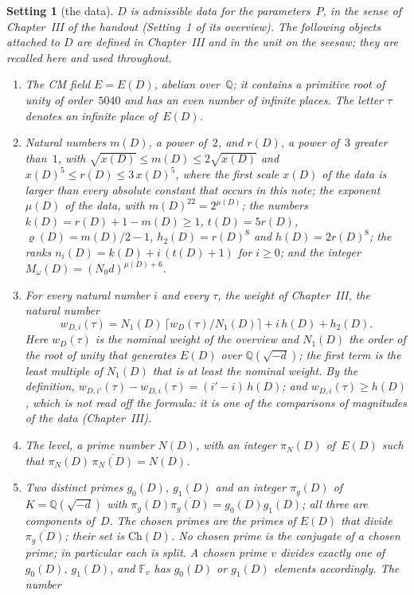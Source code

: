 \documentclass[11pt,a4paper]{article}
\newcommand{\F}{\mathbb{F}}
\newcommand{\m}[1]{\mbox{$#1$}}        %
\theoremstyle{plainx}
\theoremstyle{uprightx}
\newtheorem{setting}[theorem]{Setting}          %
\newcommand{\Ch}{\mathrm{Ch}}
\begin{document}
\begin{setting}[the data]\label{s:data}
$D$ is admissible data for the parameters~$P$, in the sense of Chapter~III of the handout (Setting~1 of its
overview). The following objects attached to $D$ are defined in Chapter~III and in the unit on the seesaw; they
are recalled here and used throughout.
\begin{enumerate}[label=\textup{(\roman*)},leftmargin=2.3em,itemsep=2pt]
\item The CM field \m{E=E(D)}, abelian over~$\mathbb Q$; it contains a primitive root of unity of order~$5040$ and
has an even number of infinite places. The letter $\tau$ denotes an infinite place of~$E(D)$.
\item Natural numbers $m(D)$, a power of~$2$, and $r(D)$, a power of~$3$ greater than~$1$, with
\m{\sqrt{x(D)}\le m(D)\le2\sqrt{x(D)}} and \m{x(D)^5\le r(D)\le3\,x(D)^5}, where the first scale $x(D)$ of the data is
larger than every absolute constant that occurs in this note; the exponent $\mu(D)$ of the data, with
\m{m(D)^{22}=2^{\mu(D)}}; the numbers
\m{k(D)=r(D)+1-m(D)\ge1}, \m{t(D)=5r(D)}, \m{\varrho(D)=m(D)/2-1}, \m{h_2(D)=r(D)^8} and \m{h(D)=2r(D)^8}; the ranks
\m{n_i(D)=k(D)+i\,(t(D)+1)} for \m{i\ge0}; and the integer \m{M_\omega(D)=(N_0d)^{\mu(D)+6}}.
\item For every natural number $i$ and every $\tau$, the \emph{weight} of Chapter~III, the natural number
\[
w_{D,i}(\tau)=N_1(D)\,\bigl\lceil w_D(\tau)/N_1(D)\bigr\rceil+i\,h(D)+h_2(D).
\]
Here \m{w_D(\tau)} is the nominal weight of the overview and \m{N_1(D)} the order of the root of unity that
generates $E(D)$ over \m{\mathbb Q(\sqrt{-d})}; the first term is the least multiple of \m{N_1(D)} that is at least
the nominal weight. By the definition, \m{w_{D,i'}(\tau)-w_{D,i}(\tau)=(i'-i)\,h(D)}; and
\m{w_{D,i}(\tau)\ge h(D)}, which is not read off the formula: it is one of the comparisons of magnitudes of the
data (Chapter~III).
\item The level, a prime number $N(D)$, with an integer $\pi_N(D)$ of~$E(D)$ such that
\m{\pi_N(D)\,\overline{\pi_N(D)}=N(D)}.
\item Two distinct primes $g_0(D)$, $g_1(D)$ and an integer $\pi_g(D)$ of \m{K=\mathbb Q(\sqrt{-d})} with
\m{\pi_g(D)\overline{\pi_g(D)}=g_0(D)g_1(D)}; all three are components of~$D$. The \emph{chosen primes} are the primes of $E(D)$ that divide~$\overline{\pi_g(D)}$; their set is
\m{\Ch(D)}. No chosen prime is the conjugate of a chosen prime; in particular each is split. A chosen prime $v$
divides exactly one of $g_0(D)$, $g_1(D)$, and $\F_v$ has $g_0(D)$ or $g_1(D)$ elements accordingly. The number

\end{enumerate}
\end{setting}
\end{document}
